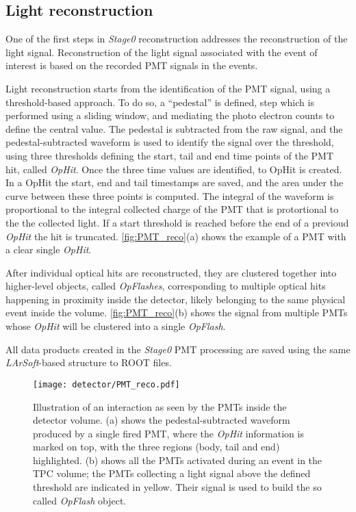 \subsection{Light reconstruction}

One of the first steps in \emph{Stage0} reconstruction addresses the reconstruction of the light signal. Reconstruction of the light signal associated with the event of interest is based on the recorded PMT signals in the events.

Light reconstruction starts from the identification of the PMT signal, using a threshold-based approach. To do so, a ``pedestal'' is defined, step which is performed using a sliding window, and mediating the photo electron counts to define the central value. The pedestal is subtracted from the raw signal, and the pedestal-subtracted waveform is used to identify the signal over the threshold, using three thresholds defining the start, tail and end time points of the PMT hit, called \emph{OpHit}. Once the three time values are identified, to OpHit is created. In a OpHit the start, end and tail timestamps are saved, and the area under the curve between these three points is computed. The integral of the waveform is proportional to the integral collected charge of the PMT that is protortional to the the collected light. If a start threshold is reached before the end of a previoud \emph{OpHit} the hit is truncated. \autoref{fig:PMT_reco}(a) shows the example of a PMT with a clear single \emph{OpHit}. 

After individual optical hits are reconstructed, they are clustered together into higher-level objects, called \emph{OpFlashes}, corresponding to multiple optical hits happening in proximity inside the detector, likely belonging to the same physical event inside the volume. \autoref{fig:PMT_reco}(b) shows the signal from multiple PMTs whose \emph{OpHit} will be clustered into a single \emph{OpFlash}.

All data products created in the \emph{Stage0} PMT processing are saved using the same \emph{LArSoft}-based structure to ROOT files. 

\begin{figure}
    \centering
    \texttt{[image: detector/PMT\_reco.pdf]}
    \caption[PMT reconstructed \emph{OpHits}]{Illustration of an interaction as seen by the PMTs inside the detector volume. (a) shows the pedestal-subtracted waveform produced by a single fired PMT, where the \emph{OpHit} information is marked on top, with the three regions (body, tail and end) highlighted. (b) shows all the PMTs activated during an event in the TPC volume; the PMTs collecting a light signal above the defined threshold are indicated in yellow. Their signal is used to build the so called \emph{OpFlash} object.}
    \label{fig:PMT_reco}
\end{figure}

